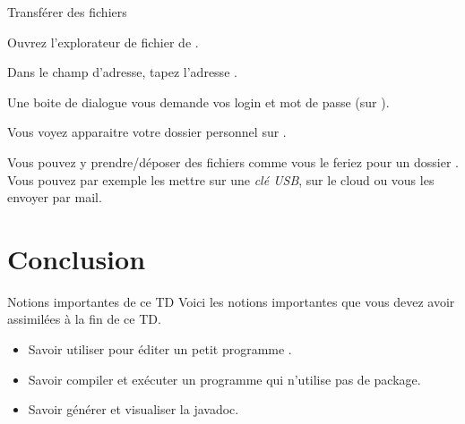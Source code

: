 \documentclass[a4paper,11pt]{style-esi/td}
\begin{document}
	\begin{Tutoriel}{Transférer des fichiers}
	\begin{steps}		
		\item 
			Ouvrez l'explorateur de fichier de .
		\item 
			Dans le champ d'adresse, tapez l'adresse .
		\item 
			Une boite de dialogue vous demande vos login et mot de passe 
			(sur ).
		\item 
			Vous voyez apparaitre votre dossier personnel sur . 
		\item 
			Vous pouvez y prendre/déposer des fichiers comme vous le 
			feriez pour un dossier . 
			Vous pouvez par exemple les mettre sur une \emph{clé USB},
			sur le cloud ou vous les envoyer par mail.
	\end{steps}
	\end{Tutoriel}			

\section{Conclusion}

	\begin{theorie}{Notions importantes de ce TD}
		Voici les notions importantes que vous devez avoir assimilées à la fin de ce TD.
		\begin{itemize}
		\item 
			Savoir utiliser  pour éditer un petit programme .
		\item 
			Savoir compiler et exécuter un programme  
			qui n'utilise pas de package.
		\item 
			Savoir générer et visualiser la javadoc.
		\end{itemize}
	\end{theorie}


		
\end{document}
